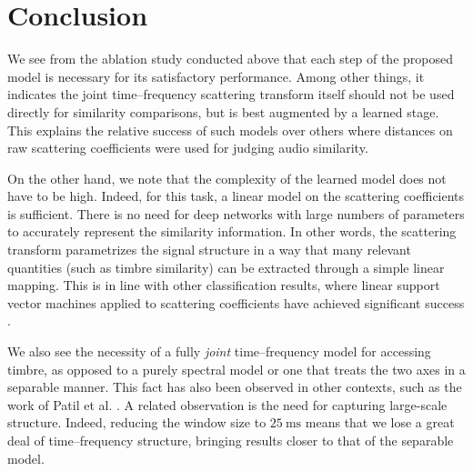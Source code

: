 \documentclass{bmcart}
\newcommand{\nmu}{}
\begin{document}


\section*{\nmu Conclusion}
\label{sec:conclusion}

We see from the ablation study conducted above that each step of the proposed model is necessary for its satisfactory performance.
Among other things, it indicates the joint time--frequency scattering transform itself should not be used directly for similarity comparisons, but is best augmented by a learned stage.
This explains the relative success of such models \cite{lostanlen2018jasmp,lostanlen2018extended} over others where distances on raw scattering coefficients were used for judging audio similarity.

On the other hand, we note that the complexity of the learned model does not have to be high.
Indeed, for this task, a linear model on the scattering coefficients is sufficient.
There is no need for deep networks with large numbers of parameters to accurately represent the similarity information.
In other words, the scattering transform parametrizes the signal structure in a way that many relevant quantities (such as timbre similarity) can be extracted through a simple linear mapping.
This is in line with other classification results, where linear support vector machines applied to scattering coefficients have achieved significant success \cite{anden2015mlsp,anden2019tsp}.

We also see the necessity of a fully \emph{joint} time--frequency model for accessing timbre, as opposed to a purely spectral model or one that treats the two axes in a separable manner.
This fact has also been observed in other contexts, such as the work of Patil et al. \cite{patil2012ploscompbiol}.
A related observation is the need for capturing large-scale structure.
Indeed, reducing the window size to $25~\mathrm{ms}$ means that we lose a great deal of time--frequency structure, bringing results closer to that of the separable model.
\end{document}
